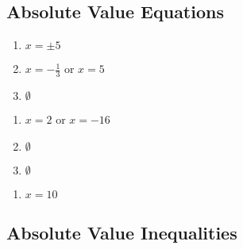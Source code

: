 \subsection*{Absolute Value Equations}

\begin{multicols}{3}
\begin{enumerate}
	\item $x = \pm 5$
	\item $x = -\frac{1}{3} \text{ or } x = 5$
	\item $\emptyset$
\end{enumerate}	\setcounter{Review}{\value{enumi}}
\end{multicols}
\begin{multicols}{3}
\begin{enumerate}	\setcounter{enumi}{\value{Review}}
	\item $x = 2$ or $x = -16$
	\item $\emptyset$
	\item $\emptyset$
\end{enumerate}	\setcounter{Review}{\value{enumi}}
\end{multicols}
\begin{multicols}{3}
\begin{enumerate}	\setcounter{enumi}{\value{Review}}
	\item $x = 10$
\end{enumerate}	\setcounter{Review}{\value{enumi}}
\end{multicols}



\subsection*{Absolute Value Inequalities}

